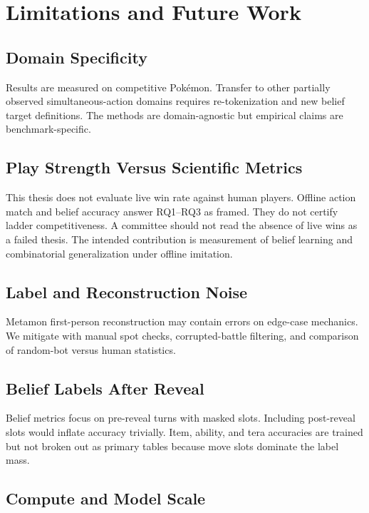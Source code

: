\chapter{Limitations and Future Work}
\label{ch:limitations}

\section{Domain Specificity}

Results are measured on competitive Pok\'emon. Transfer to other partially
observed simultaneous-action domains requires re-tokenization and new belief
target definitions. The methods are domain-agnostic but empirical claims are
benchmark-specific.

\section{Play Strength Versus Scientific Metrics}

This thesis does not evaluate live win rate against human players. Offline
action match and belief accuracy answer RQ1--RQ3 as framed. They do not certify
ladder competitiveness. A committee should not read the absence of live wins as
a failed thesis. The intended contribution is measurement of belief learning and
combinatorial generalization under offline imitation.

\section{Label and Reconstruction Noise}

Metamon first-person reconstruction may contain errors on edge-case mechanics.
We mitigate with manual spot checks, corrupted-battle filtering, and comparison
of random-bot versus human statistics.

\section{Belief Labels After Reveal}

Belief metrics focus on pre-reveal turns with masked slots. Including post-reveal
slots would inflate accuracy trivially. Item, ability, and tera accuracies are
trained but not broken out as primary tables because move slots dominate the
label mass.

\section{Compute and Model Scale}

